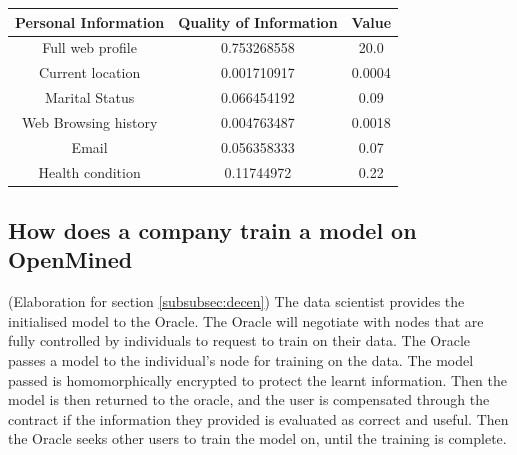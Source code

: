 \documentclass{icmmcm}
\begin{document}

\begin{center}
\begin{tabular}{ c|c|c } 
 Personal Information & Quality of Information & Value \\ 
 \hline  \hline
 Full web profile & 0.753268558              & 20.0 \\ 
 Current location & 0.001710917         & 0.0004  \\
 Marital Status & 0.066454192                         & 0.09  \\
 Web Browsing history & 0.004763487                & 0.0018  \\
 Email & 0.056358333              & 0.07  \\
 Health condition & 0.11744972   & 0.22
\end{tabular}
\end{center}


\subsection{How does a company train a model on OpenMined}

(Elaboration for section \ref{subsubsec:decen})
The data scientist provides the initialised model to the Oracle. The Oracle will negotiate with nodes that are fully controlled by individuals to request to train on their data. The Oracle passes a model to the individual’s node for training on the data. The model passed is homomorphically encrypted to protect the learnt information. Then the model is then returned to the oracle, and the user is compensated through the contract if the information they provided is evaluated as correct and useful. Then the Oracle seeks other users to train the model on, until the training is complete.

\newpage


\end{document}

